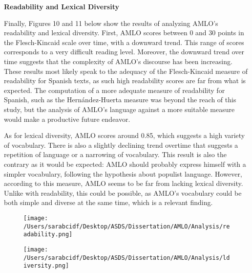 \documentclass[]{article}
\begin{document}
\noindent\textbf{Readability and Lexical Diversity}
\vspace{.5cm}

Finally, Figures 10 and 11 below show the results of analyzing AMLO's readability and lexical diversity. First, AMLO scores between 0 and 30 points in the Flesch-Kincaid scale over time, with a downward trend. This range of scores corresponds to a very difficult reading level. Moreover, the downward trend over time suggests that the complexity of AMLO's discourse has been increasing. These results most likely speak to the adequacy of the Flesch-Kincaid measure of readability for Spanish texts, as such high readability scores are far from what is expected. The computation of a more adequate measure of readability for Spanish, such as the Hernández-Huerta measure was beyond the reach of this study, but the analysis of AMLO's language against a more suitable measure would make a productive future endeavor. 

As for lexical diversity, AMLO scores around 0.85, which suggests a high variety of vocabulary. There is also a slightly declining trend overtime that suggests a repetition of language or a narrowing of vocabulary. This result is also the contrary as it would be expected: AMLO should probably express himself with a simpler vocabulary, following the hypothesis about populist language. However, according to this measure, AMLO seems to be far from lacking lexical diversity. Unlike with readability, this could be possible, as AMLO's vocabulary could be both simple and diverse at the same time, which is a relevant finding. 

\begin{figure}[H]
	\centering
	\caption{\label{}}
	\texttt{[image: /Users/sarabcidf/Desktop/ASDS/Dissertation/AMLO/Analysis/readability.png]}
\end{figure}

\begin{figure}[H]
	\centering
	\caption{\label{}}
	\texttt{[image: /Users/sarabcidf/Desktop/ASDS/Dissertation/AMLO/Analysis/ldiversity.png]}
\end{figure}
\end{document}

